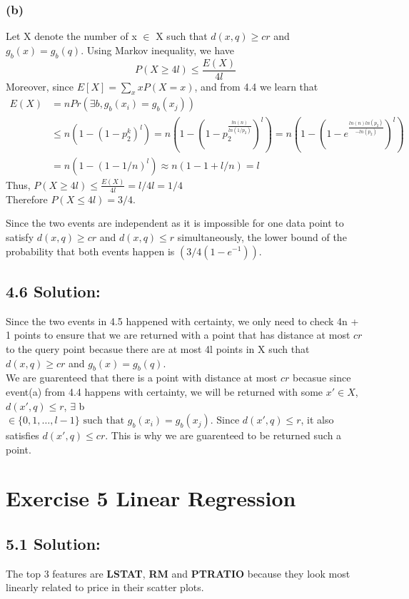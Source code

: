 \documentclass{article}
\begin{document}
\subsubsection*{(b)}
Let X denote the number of x $\in$ X such that $d(x,q) \geq cr$ and $g_b(x) = g_b(q)$. Using Markov inequality, we have
\[P(X \geq 4l) \leq \frac{E(X)}{4l}\]
Moreover, since $E[X] = \sum_{x} x P(X = x)$, and from 4.4 we learn that 
\begin{align*}
    E(X) &= n Pr(\exists b, g_b(x_i) = g_b(x_j)) \\
         &\leq n(1 - (1 - p_2^k)^l) = n (1 - ( 1 - p_2^{\frac{ln(n)}{ln(1/p_2)}})^l) = n(1 - (1 - e^{\frac{ln(n) ln(p_2)}{-ln(p_2)}} )^l)\\
         &= n(1 - (1 - 1/n)^l) \approx n(1 - 1 + l / n) = l
\end{align*} 
Thus, $P(X \geq 4l) \leq \frac{E(X)}{4l} = l / 4l = 1 / 4$ \\
Therefore $P(X \leq 4l) = 3 / 4$.

Since the two events are independent as it is impossible for one data point to satisfy $d(x,q) \geq cr$ and $d(x,q) \leq r$ simultaneously, 
the lower bound of the probability that both events happen is $(3/4 (1 - e^{-1}))$.





\subsection*{4.6 Solution:}
Since the two events in 4.5 happened with certainty, we only need to check 4n + 1 points to ensure that we are returned with a point that has distance at most $cr$ to the query point becasue there are at most 4l points in X such that  $d(x,q) \geq cr$ and $g_b(x) = g_b(q)$.\\
We are guarenteed that there is a point with distance at most $cr$ becasue since event(a) from 4.4 happens with certainty, we will be returned with some $x' \in X$, $d(x',q) \leq r$, $\exists$ b $\in \{0, 1, \dots, l-1\} \text{ such that } g_b(x_i) = g_b(x_j). \text{ Since } d(x', q) \leq r$, it also satisfies $d(x', q) \leq cr$. This is why we are guarenteed to be returned such a point.




\newpage
\section*{Exercise 5 Linear Regression}
\subsection*{5.1 Solution:}
The top 3 features are \textbf{LSTAT}, \textbf{RM} and \textbf{PTRATIO} because they look most linearly related to price in their scatter plots.
\end{document}
